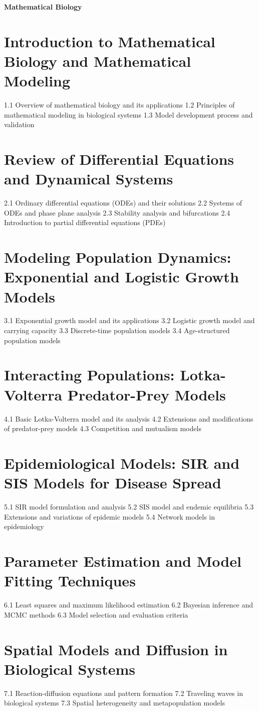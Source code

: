 {\LARGE \bf{Mathematical Biology}}
\section{Introduction to Mathematical Biology and Mathematical Modeling}
1.1 Overview of mathematical biology and its applications
1.2 Principles of mathematical modeling in biological systems
1.3 Model development process and validation
\section{Review of Differential Equations and Dynamical Systems}
2.1 Ordinary differential equations (ODEs) and their solutions
2.2 Systems of ODEs and phase plane analysis
2.3 Stability analysis and bifurcations
2.4 Introduction to partial differential equations (PDEs)
\section{Modeling Population Dynamics: Exponential and Logistic Growth Models}
3.1 Exponential growth model and its applications
3.2 Logistic growth model and carrying capacity
3.3 Discrete-time population models
3.4 Age-structured population models
\section{Interacting Populations: Lotka-Volterra Predator-Prey Models}
4.1 Basic Lotka-Volterra model and its analysis
4.2 Extensions and modifications of predator-prey models
4.3 Competition and mutualism models
\section{Epidemiological Models: SIR and SIS Models for Disease Spread}
5.1 SIR model formulation and analysis
5.2 SIS model and endemic equilibria
5.3 Extensions and variations of epidemic models
5.4 Network models in epidemiology
\section{Parameter Estimation and Model Fitting Techniques}
6.1 Least squares and maximum likelihood estimation
6.2 Bayesian inference and MCMC methods
6.3 Model selection and evaluation criteria
\section{Spatial Models and Diffusion in Biological Systems}
7.1 Reaction-diffusion equations and pattern formation
7.2 Traveling waves in biological systems
7.3 Spatial heterogeneity and metapopulation models
